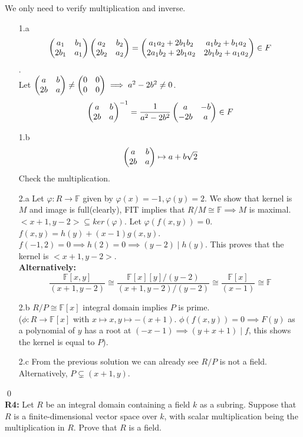 \soln
We only need to verify multiplication and inverse.
\begin{itemize}
	\item[1.a] $$ \begin{pmatrix} a_1 & b_1\\ 2b_1 & a_1 \end{pmatrix}\begin{pmatrix} a_2 & b_2\\ 2b_2 & a_2 \end{pmatrix}=\begin{pmatrix} a_1a_2 + 2b_1b_2 & a_1b_2+b_1a_2\\ 2a_1b_2+2b_1a_2 & 2b_1b_2+a_1a_2 \end{pmatrix}\in F $$. \\
	Let $ \begin{pmatrix} a & b\\ 2b & a \end{pmatrix}\ne \begin{pmatrix} 0 & 0\\ 0 & 0 \end{pmatrix}\implies a^2 -2b^2 \ne 0 $.
	$$ \begin{pmatrix} a & b\\ 2b & a \end{pmatrix}^{-1}= \frac{1}{a^2-2b^2}\begin{pmatrix} a & -b\\ -2b & a \end{pmatrix}\in F $$
	\item[1.b] $$ \begin{pmatrix} a & b\\ 2b & a \end{pmatrix}\mapsto a + b\sqrt{2} $$ Check the multiplication.
	\item[2.a] Let $ \varphi: R \to \mathbb{F} $ given by $ \varphi(x) = -1, \varphi(y)=2 $. We show that kernel is $ M $ and image is full(clearly), FIT implies that $ R/M \cong \mathbb{F} \implies M $ is maximal.\\
	$ <x+1,y-2>\subseteq ker(\varphi) $. Let $ \varphi(f(x,y))=0 $. $ f(x,y)= h(y)+ (x-1)g(x,y) $.\\
	$ f(-1,2)=0 \implies h(2)=0 \implies (y-2)\mid h(y)$. This proves that the kernel is $ <x+1,y-2> $.\\
	\textbf{Alternatively:} $$ \dfrac{\mathbb{F}[x,y]}{(x+1,y-2)} \cong \dfrac{\mathbb{F}[x][y]/(y-2)}{(x+1,y-2)/(y-2)} \cong \dfrac{\mathbb{F}[x]}{(x-1)} \cong \mathbb{F} $$
	\item[2.b] $ R/P \cong \mathbb{F}[x] $ integral domain implies $ P $ is prime.\\
	($ \phi: R \to \mathbb{F}[x] $ with $ x\mapsto x, y \mapsto -(x+1) $. $ \phi(f(x,y))=0 \implies F(y)$ as a polynomial of $ y $ has a root at $ (-x-1) \implies (y+x+1) \mid f $, this shows the kernel is equal to $ P $).
	\item[2.c] From the previous solution we can already see $ R/P $ is not a field. Alternatively, $ P\subsetneq (x+1,y) $.  
\end{itemize}
\qed\\
\textbf{R4:} Let $R$ be an integral domain containing a field $k$ as a subring. Suppose that $R$ is a finite-dimensional vector space over $k$, with scalar multiplication being the multiplication in $R$. Prove that $R$ is a field.\\
\soln
